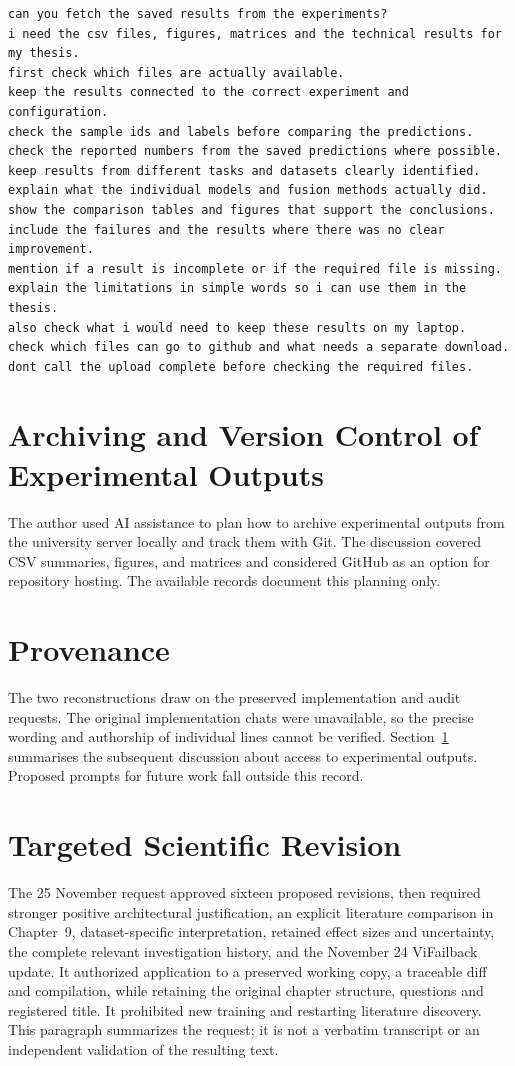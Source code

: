 \begingroup\singlespacing\footnotesize
\begin{verbatim}
can you fetch the saved results from the experiments?
i need the csv files, figures, matrices and the technical results for my thesis.
first check which files are actually available.
keep the results connected to the correct experiment and configuration.
check the sample ids and labels before comparing the predictions.
check the reported numbers from the saved predictions where possible.
keep results from different tasks and datasets clearly identified.
explain what the individual models and fusion methods actually did.
show the comparison tables and figures that support the conclusions.
include the failures and the results where there was no clear improvement.
mention if a result is incomplete or if the required file is missing.
explain the limitations in simple words so i can use them in the thesis.
also check what i would need to keep these results on my laptop.
check which files can go to github and what needs a separate download.
dont call the upload complete before checking the required files.
\end{verbatim}
\endgroup

\section{Archiving and Version Control of Experimental Outputs}
\label{sec:results-archiving}
The author used AI assistance to plan how to archive experimental outputs from the university server locally and track them with Git. The discussion covered CSV summaries, figures, and matrices and considered GitHub as an option for repository hosting. The available records document this planning only.

\section{Provenance}
The two reconstructions draw on the preserved implementation and audit requests. The original implementation chats were unavailable, so the precise wording and authorship of individual lines cannot be verified. Section~\ref{sec:results-archiving} summarises the subsequent discussion about access to experimental outputs. Proposed prompts for future work fall outside this record.

\section{Targeted Scientific Revision}
The 25 November request approved sixteen proposed revisions, then required stronger positive architectural justification, an explicit literature comparison in Chapter~9, dataset-specific interpretation, retained effect sizes and uncertainty, the complete relevant investigation history, and the November 24 ViFailback update. It authorized application to a preserved working copy, a traceable diff and compilation, while retaining the original chapter structure, questions and registered title. It prohibited new training and restarting literature discovery. This paragraph summarizes the request; it is not a verbatim transcript or an independent validation of the resulting text.

